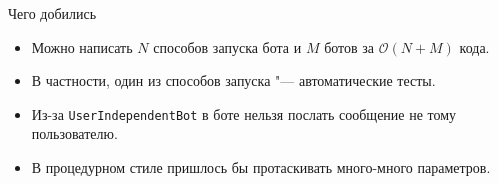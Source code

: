 \begin{frame}[t]{Чего добились}
\begin{itemize}
	\item Можно написать $N$ способов запуска бота и $M$ ботов за $\mathcal O(N+M)$ кода.
	\item В частности, один из способов запуска "--- автоматические тесты.
	\item Из-за \texttt{UserIndependentBot} в боте нельзя послать сообщение не тому пользователю.
	\item В процедурном стиле пришлось бы протаскивать много-много параметров.
\end{itemize}
\end{frame}
